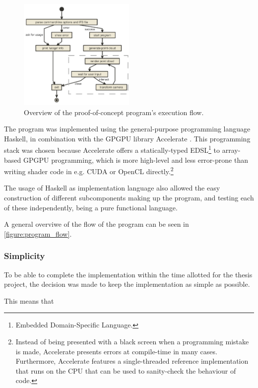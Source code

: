\documentclass[11pt]{article}
\begin{document}
\begin{figure}
  \centering
  \includegraphics[width=0.5\textwidth]{figures/program_execution}
  \caption{Overview of the proof-of-concept program's execution flow.}
\label{figure:program_flow}
\end{figure}

The program was implemented using the general-purpose programming language Haskell, 
in combination with the GPGPU library Accelerate \cite{chakravarty2011accelerating}.
This programming stack was chosen because Accelerate 
offers a statically-typed EDSL\footnote{Embedded Domain-Specific Language.} to array-based GPGPU programming,
which is more high-level and less error-prone than writing shader code in e.g. CUDA or OpenCL directly.\footnote{Instead of being presented with a black screen when a programming mistake is made, 
Accelerate presents errors at compile-time in many cases. Furthermore, Accelerate features a
single-threaded reference implementation that runs on the CPU that can be used to sanity-check the behaviour of code.}

The usage of Haskell as implementation language also allowed 
the easy construction of different subcomponents making up the program,
and testing each of these independently, being a pure functional language.

A general overviwe of the flow of the program can be seen in \autoref{figure:program_flow}.

\subsubsection{Simplicity}
\label{sec:orga2c51f5}

To be able to complete the implementation within the time allotted for the thesis project,
the decision was made to keep the implementation as simple as possible.

This means that 
\end{document}
